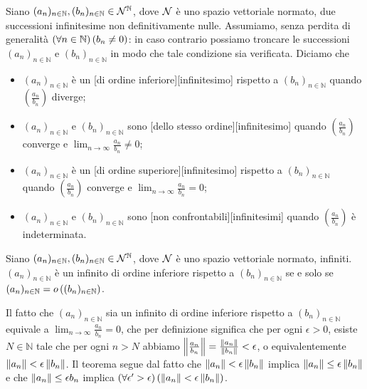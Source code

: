 \begin{Definition}
	Siano $(a_n)_{n \in \mathbb{N}}, (b_n)_{n \in \mathbb{N}} \in \mathcal{N}^\mathbb{N}$, dove $\mathcal{N}$ \`e uno spazio vettoriale normato, due successioni infinitesime non definitivamente nulle. Assumiamo, senza perdita di generalit\`a $\left ( \forall n \in \mathbb{N} \right ) \left ( b_n \neq 0 \right )$: in caso contrario possiamo troncare le successioni $(a_n)_{n \in \mathbb{N}}$ e $(b_n)_{n \in \mathbb{N}}$ in modo che tale condizione sia verificata. Diciamo che 
	\begin{itemize}
		\item $(a_n)_{n \in \mathbb{N}}$ \`e un [di ordine inferiore][infinitesimo] rispetto a $(b_n)_{n \in \mathbb{N}}$ quando $\left ( \frac{a_n}{b_n} \right )$ diverge;
		\item $(a_n)_{n \in \mathbb{N}}$ e $(b_n)_{n \in \mathbb{N}}$ sono [dello stesso ordine][infinitesimo] quando $\left ( \frac{a_n}{b_n} \right )$ converge e $\lim_{n \rightarrow \infty} \frac{a_n}{b_n} \neq 0$;
		\item $(a_n)_{n \in \mathbb{N}}$ \`e un [di ordine superiore][infinitesimo] rispetto a $(b_n)_{n \in \mathbb{N}}$ quando $\left ( \frac{a_n}{b_n} \right )$ converge e $\lim_{n \rightarrow \infty} \frac{a_n}{b_n} = 0$;
		\item $(a_n)_{n \in \mathbb{N}}$ e $(b_n)_{n \in \mathbb{N}}$ sono [non confrontabili][infinitesimi] quando $\left ( \frac{a_n}{b_n} \right )$ \`e indeterminata.
	\end{itemize}
\end{Definition}
\begin{Theorem}
	Siano $(a_n)_{n \in \mathbb{N}}, (b_n)_{n \in \mathbb{N}} \in \mathcal{N}^\mathbb{N}$, dove $\mathcal{N}$ \`e uno spazio vettoriale normato, infiniti. $(a_n)_{n \in \mathbb{N}}$ \`e un infinito di ordine inferiore rispetto a $(b_n)_{n \in \mathbb{N}}$ se e solo se $(a_n)_{n \in \mathbb{N}} = o \left ( (b_n)_{n \in \mathbb{N}} \right )$.
\end{Theorem}
\Proof Il fatto che $(a_n)_{n \in \mathbb{N}}$ sia un infinito di ordine inferiore rispetto a $(b_n)_{n \in \mathbb{N}}$ equivale a $\lim_{n \rightarrow \infty} \frac{a_n}{b_n} = 0$, che per definizione significa che per ogni $\epsilon > 0$, esiste $N \in \mathbb{N}$ tale che per ogni $n > N$ abbiamo $\Norm{\frac{a_n}{b_n}} = \frac{\Norm{a_n}}{\Norm{b_n}} < \epsilon$, o equivalentemente $\Norm{a_n} < \epsilon \Norm{b_n}$. Il teorema segue dal fatto che $\Norm{a_n} < \epsilon \Norm{b_n}$ implica $\Norm{a_n} \leq \epsilon \Norm{b_n}$ e che $\Norm{a_n} \leq \epsilon{b_n}$ implica $\ForAll{\epsilon' > \epsilon}{\Norm{a_n} < \epsilon \Norm{b_n}}$. \EndProof
